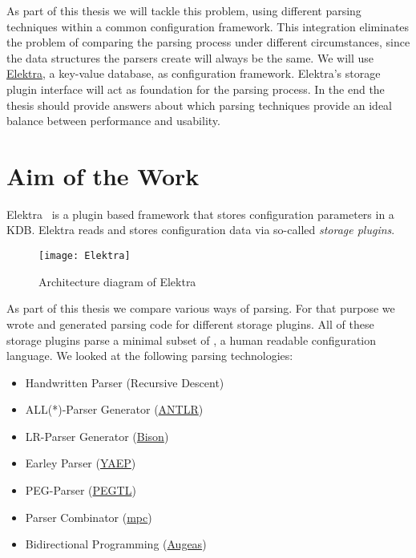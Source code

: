 As part of this thesis we will tackle this problem, using different parsing techniques within a common configuration framework. This integration eliminates the problem of comparing the parsing process under different circumstances, since the data structures the parsers create will always be the same. We will use \href{http://web.libelektra.org}{Elektra}, a key-value database, as configuration framework. Elektra’s storage plugin interface will act as foundation for the parsing process. In the end the thesis should provide answers about which parsing techniques provide an ideal balance between performance and usability.

\section{Aim of the Work}
\label{sec:aim_of_the_work}

Elektra~\cite{raab2010modular, raab2017context} is a plugin based framework that stores configuration parameters in a \gls{KDB}. Elektra reads and stores configuration data via so-called \emph{storage plugins}.

\begin{figure}[H]
  \centering
    \texttt{[image: Elektra]}
  \caption{Architecture diagram of Elektra}
\end{figure}

As part of this thesis we compare various ways of parsing. For that purpose we wrote and generated parsing code for different storage plugins. All of these storage plugins parse a minimal subset of , a human readable configuration language. We looked at the following parsing technologies:

\begin{itemize}
  \item Handwritten Parser (Recursive Descent)
  \item ALL(*)-Parser Generator (\href{http://www.antlr.org}{ANTLR})
  \item LR-Parser Generator (\href{https://www.gnu.org/software/bison}{Bison})
  \item Earley Parser (\href{https://github.com/vnmakarov/yaep}{YAEP})
  \item PEG-Parser (\href{https://github.com/taocpp/PEGTL}{PEGTL})
  \item Parser Combinator (\href{https://github.com/orangeduck/mpc}{mpc})
  \item Bidirectional Programming (\href{http://augeas.net}{Augeas})
\end{itemize}

